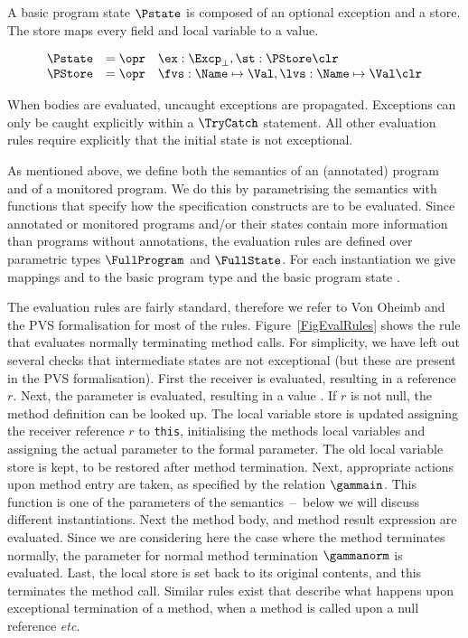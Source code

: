 A basic program state \(\Pstate\) is composed of an optional exception
and a store.  The store maps every field and local variable to a
value.

\[
\begin{array}{rcl}
\Pstate & = \opr & \ex : \Excp_{\bot}, \st : \PStore \clr\\
\PStore & = \opr & \fvs : \Name \mapsto \Val, \lvs : \Name \mapsto \Val \clr
\end{array}
\]

When bodies are evaluated, uncaught exceptions are propagated.
Exceptions can only be caught explicitly within a \(\TryCatch\) statement.
All other evaluation rules require explicitly that the initial state is not
exceptional.

As mentioned above, we define both the semantics of an (annotated)
program and of a monitored program. We do this by parametrising the
semantics with functions that specify how the specification constructs
are to be evaluated. Since annotated or monitored programs and/or
their states contain more information than programs without annotations,
the evaluation rules are defined over parametric types
\(\FullProgram\) and \(\FullState\). For each instantiation we give
mappings \program and \progstate to the basic program type \Program
and the basic program state \Pstate.

The evaluation rules are fairly standard, therefore we refer to Von
Oheimb and the PVS formalisation for most of the
rules. Figure~\ref{FigEvalRules} shows the rule that evaluates
normally terminating method calls. For simplicity, we have left out
several checks that intermediate states are not exceptional (but these
are present in the PVS formalisation). First the receiver is
evaluated, resulting in a reference \(r\). Next, the parameter is
evaluated, resulting in a value \act. If \(r\) is not null, the method
definition \md can be looked up. The local variable store is updated
assigning the receiver reference \(r\) to \texttt{this},
initialising the methods local variables and assigning the actual
parameter to the formal parameter. The old local variable store is
kept, to be restored after method termination. Next, appropriate
actions upon method entry are taken, as specified by the relation
\(\gammain\). This function is one of the parameters of the
semantics~--~below we will discuss different instantiations. Next the
method body, and method result expression are evaluated. Since we are
considering here the case where the method terminates normally, the
parameter for normal method termination \(\gammanorm\) is
evaluated. Last, the local store is set back to its original contents,
and this terminates the method call. Similar rules exist that describe
what happens upon exceptional termination of a method, when a method
is called upon a null reference \emph{etc.}



